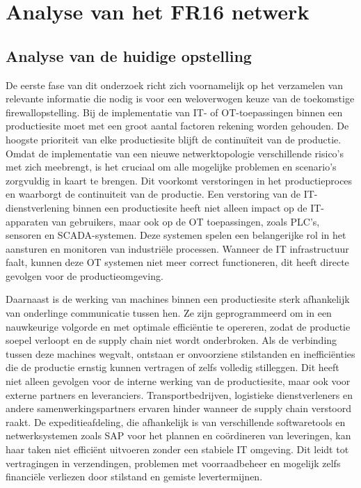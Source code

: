\chapter{Analyse van het FR16 netwerk}

\label{ch:onderzoek}

\section{Analyse van de huidige opstelling}

De eerste fase van dit onderzoek richt zich voornamelijk op het verzamelen van relevante informatie die nodig is voor een weloverwogen keuze van de toekomstige firewallopstelling. Bij de implementatie van IT- of OT-toepassingen binnen een productiesite moet met een groot aantal factoren rekening worden gehouden. De hoogste prioriteit van elke productiesite blijft de continuïteit van de productie. Omdat de implementatie van een nieuwe netwerktopologie verschillende risico’s met zich meebrengt, is het cruciaal om alle mogelijke problemen en scenario’s zorgvuldig in kaart te brengen. Dit voorkomt verstoringen in het productieproces en waarborgt de continuiteit van de productie.
Een verstoring van de IT-dienstverlening binnen een productiesite heeft niet alleen impact op de IT-apparaten van gebruikers, maar ook op de OT toepassingen, zoals PLC’s, sensoren en SCADA-systemen. Deze systemen spelen een belangerijke rol in het aansturen en monitoren van industriële processen. Wanneer de IT infrastructuur faalt, kunnen deze OT systemen niet meer correct functioneren, dit heeft directe gevolgen voor de productieomgeving. 

\vspace{5mm}
Daarnaast is de werking van machines binnen een productiesite sterk afhankelijk van onderlinge communicatie tussen hen. Ze zijn geprogrammeerd om in een nauwkeurige volgorde en met optimale efficiëntie te opereren, zodat de productie soepel verloopt en de supply chain niet wordt onderbroken. Als de verbinding tussen deze machines wegvalt, ontstaan er onvoorziene stilstanden en inefficiënties die de productie ernstig kunnen vertragen of zelfs volledig stilleggen. Dit heeft niet alleen gevolgen voor de interne werking van de productiesite, maar ook voor externe partners en leveranciers. Transportbedrijven, logistieke dienstverleners en andere samenwerkingspartners ervaren hinder wanneer de supply chain verstoord raakt. De expeditieafdeling, die afhankelijk is van verschillende softwaretools en netwerksystemen zoals SAP voor het plannen en coördineren van leveringen, kan haar taken niet efficiënt uitvoeren zonder een stabiele IT omgeving. Dit leidt tot vertragingen in verzendingen, problemen met voorraadbeheer en mogelijk zelfs financiële verliezen door stilstand en gemiste levertermijnen.


